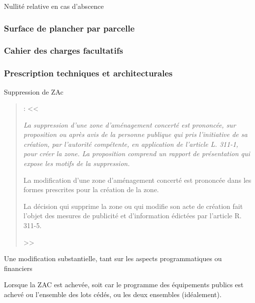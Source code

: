 		Nullité relative en cas d'abscence

		\subsubsection{Surface de plancher par parcelle}

		\subsubsection{Cahier des charges facultatifs}

		\subsubsection{Prescription techniques et architecturales}

Suppression de ZAc

\begin{quote}
	\textbf{} :
	<< 
	{\itshape La suppression d'une zone d'aménagement concerté est prononcée, sur proposition ou après avis de la personne publique qui pris l'initiative de sa création, par l'autorité compétente, en application de l'article L. 311-1, pour créer la zone. La proposition comprend un rapport de présentation qui expose les motifs de la suppression.
		
	\medskip La modification d'une zone d'aménagement concerté est prononcée dans les formes prescrites pour la création de la zone.
	
	\medskip La décision qui supprime la zone ou qui modifie son acte de création fait l'objet des mesures de publicité et d'information édictées par l'article R. 311-5.} >>
\end{quote}

Une modification substantielle, tant sur les aspects programmatiques ou financiers \lips

Lorsque la ZAC est achevée, soit car le programme des équipements publics est achevé ou l'ensemble des lots cédés, ou les deux ensembles (idéalement).
